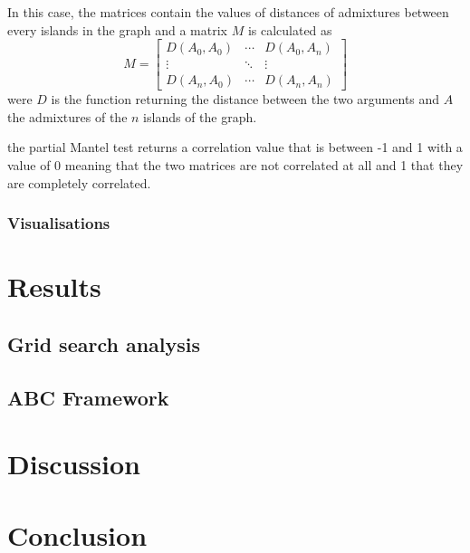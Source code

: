 \documentclass[a4paper,11pt]{report}
\begin{document}
In this case, the matrices contain the values of distances of admixtures between every islands in the graph and a matrix $M$ is calculated as
\begin{equation}
	M = \begin{bmatrix}
		D(A_0, A_0)	& \cdots & D(A_0, A_n) 	\\
		\vdots		& \ddots & \vdots		\\
		D(A_n, A_0) & \cdots & D(A_n, A_n)
	\end{bmatrix}
\end{equation}
were $D$ is the function returning the distance between the two arguments and $A$ the admixtures of the $n$ islands of the graph.

the partial Mantel test returns a correlation value that is between -1 and 1 with a value of 0 meaning that the two matrices are not correlated at all and 1 that they are completely correlated.

\subsection{Visualisations}




\chapter{Results}
\section{Grid search analysis}


\section{ABC Framework}


\chapter{Discussion}


\chapter*{Conclusion}



\end{document}

